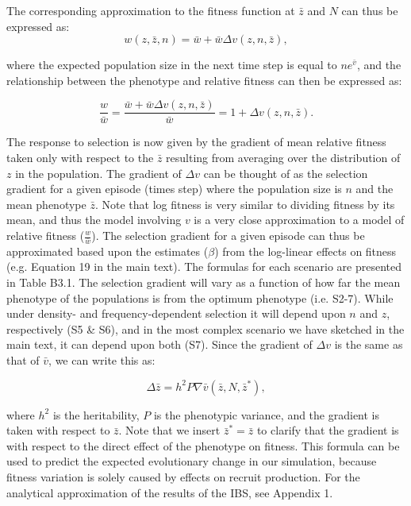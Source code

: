 \documentclass{article}
\begin{document}
\noindent The corresponding approximation to the fitness function at $\bar{z}$ and $N$ can thus be expressed as:
 \begin{equation}
 w(z,\bar{z},n)=\bar{w} + \bar{w} \Delta v(z,n, \bar{z}),  \tag{B3.4}\label{B35} 
 \end{equation}

\noindent where the expected population size in the next time step is equal to $ne^{\bar{v}}$, and the relationship between the phenotype and relative fitness can then be expressed as:

\begin{equation}
\frac{w}{\bar{w}}= \frac{\bar{w} + \bar{w} \Delta v(z,n, \bar{z})}{\bar{w}}=1 + \Delta v(z,n, \bar{z}). \tag{B3.5}\label{B36} 
\end{equation}

The response to selection is now given by the gradient of mean relative fitness taken only with respect to the $\bar{z}$ resulting from averaging over the distribution of $z$ in the population. The gradient of $ \Delta v$ can be thought of as the selection gradient for a given episode (times step) where the population size is $n$ and the mean phenotype $\bar{z}$. Note that log fitness is very similar to dividing fitness by its mean, and thus the model involving $v$ is a very close approximation to a model of relative fitness ($\frac{w}{\bar{w}}$). The selection gradient for a given episode can thus be approximated based upon the estimates ($\beta$) from the log-linear effects on fitness (e.g. Equation 19 in the main text). The formulas for each scenario are presented in Table B3.1. The selection gradient will vary as a function of how far the mean phenotype of the populations is from the optimum phenotype (i.e. S2-7). While under density- and frequency-dependent selection it will depend upon $n$ and $z$, respectively (S5 \& S6), and in the most complex scenario we have sketched in the main text, it can depend upon both (S7). Since the gradient of $\Delta v$ is the same as that of $\bar{v}$, we can write this as: 

\begin{equation}
 \Delta \bar{z}=h^2P \nabla \bar{v}(\bar{z},N,\bar{z}^*), \tag{B3.6}\label{B37} 
\end{equation}

\noindent where $h^2$ is the heritability, $P$ is the phenotypic variance, and the gradient is taken with respect to $\bar{z}$. Note that we insert $\bar{z}^*=\bar{z}$ to clarify that the gradient is with respect to the direct effect of the phenotype on fitness. This formula can be used to predict the expected evolutionary change in our simulation, because fitness variation is solely caused by effects on recruit production. For the analytical approximation of the results of the IBS, see Appendix 1.
\end{document}
